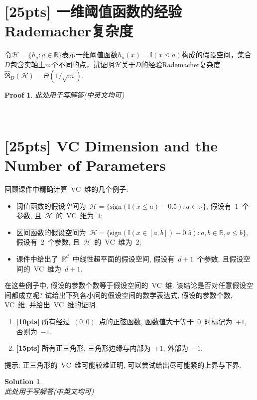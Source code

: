 \documentclass[a4paper,UTF8]{article}
\numberwithin{equation}{section}
\newtheorem*{myProof}{Proof}
\newtheorem*{mySol}{Solution}
\begin{document}
\newpage 

\section{[25pts] 一维阈值函数的经验Rademacher复杂度}

\noindent 令$ \mathcal{H}=\{h_a:a\in\mathbb{R}\} $表示一维阈值函数$ h_a(x)=\mathbb{I}(x\leq a) $构成的假设空间，集合$ D $包含实轴上$ m $个不同的点，试证明$ \mathcal{H} $关于$ D $的经验Rademacher复杂度$ \hat{\mathfrak{R}}_{D}(\mathcal{H})=\Theta(1/\sqrt{m}) $. 

\begin{myProof}
    此处用于写解答(中英文均可)
    
    
\end{myProof}~\\
    
\newpage 

\section{[25pts] VC Dimension and the Number of Parameters} 

\noindent 回顾课件中精确计算~VC~维的几个例子: 
\begin{itemize}
    \item 阈值函数的假设空间为~$ \mathcal{H} = \{ \text{sign}( \mathbb{I}(x \leqslant a) - 0.5 ) : a \in \mathbb{R} \} $, 假设有~$1$~个参数, 且~$\mathcal{H}$~的~VC~维为~$1$; 
    \item 区间函数的假设空间为~$ \mathcal{H} = \{ \text{sign}( \mathbb{I}( x \in [a,b] ) - 0.5 ) : a,b \in \mathbb{R} , a \leqslant b \} $, 假设有~$2$~个参数, 且~$\mathcal{H}$~的~VC~维为~$2$; 
    \item 课件中给出了~$\mathbb{R}^d$~中线性超平面的假设空间, 假设有~$d+1$~个参数, 且假设空间的~VC~维为~$d+1$. 
\end{itemize}
在这些例子中, 假设的参数个数等于假设空间的~VC~维. 该结论是否对任意假设空间都成立呢? 试给出下列各小问的假设空间的数学表达式, 假设的参数个数, VC~维, 并给出~VC~维的证明. 
\begin{enumerate}[(1)]
    \item \textbf{[10pts]} 所有经过~$(0,0)$~点的正弦函数, 函数值大于等于~$0$~时标记为~$+1$, 否则为~$-1$. 
    \item \textbf{[15pts]} 所有正三角形, 三角形边缘与内部为~$+1$, 外部为~$-1$. 
\end{enumerate}
提示: 正三角形的~VC~维可能较难证明, 可以尝试给出尽可能紧的上界与下界. 

\begin{mySol}~\\
    此处用于写解答(中英文均可)
\end{mySol}
\end{document}
